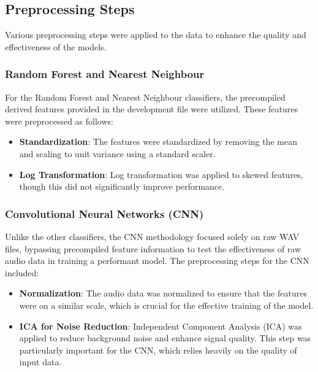 \subsection{Preprocessing Steps}
Various preprocessing steps were applied to the data to enhance the quality and effectiveness of the models.

\subsubsection{Random Forest and Nearest Neighbour}
For the Random Forest and Nearest Neighbour classifiers, the precompiled derived features provided in the development file were utilized. These features were preprocessed as follows:
\begin{itemize}
    \item \textbf{Standardization}: The features were standardized by removing the mean and scaling to unit variance using a standard scaler.
    \item \textbf{Log Transformation}: Log transformation was applied to skewed features, though this did not significantly improve performance.
\end{itemize}

\subsubsection{Convolutional Neural Networks (CNN)}
Unlike the other classifiers, the CNN methodology focused solely on raw WAV files, bypassing precompiled feature information to test the effectiveness of raw audio data in training a performant model. The preprocessing steps for the CNN included:
\begin{itemize}
    \item \textbf{Normalization}: The audio data was normalized to ensure that the features were on a similar scale, which is crucial for the effective training of the model.
    \item \textbf{ICA for Noise Reduction}: Independent Component Analysis (ICA) was applied to reduce background noise and enhance signal quality. This step was particularly important for the CNN, which relies heavily on the quality of input data.
\end{itemize}

